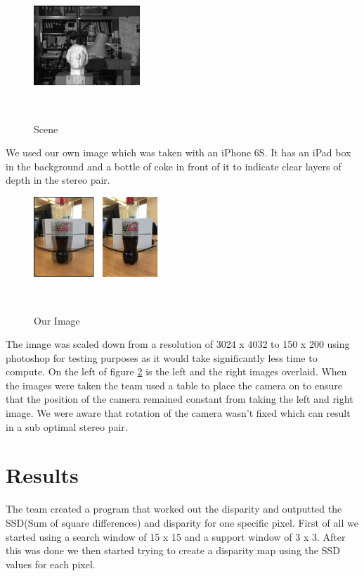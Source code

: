 \documentclass[twocolumn]{article}
\begin{document}
\begin{figure}[H]
\centering
  \includegraphics[width=40mm]{Figures/scene}
    \caption{Scene}~\label{fig:scene}
\end{figure} 

We used our own image which was taken with an iPhone 6S. It has an iPad box in the background and a bottle of coke in front of it to indicate clear layers of depth in the stereo pair.

\begin{figure}[H]
\centering
  \includegraphics[height=30mm]{Figures/Coke_Image}
    \caption{Our Image}~\label{fig:CokeScene}
\end{figure} 

The image was scaled down from a resolution of 3024 x 4032 to 150 x 200 using photoshop for testing purposes as it would take significantly less time to compute. On the left of figure \ref{fig:CokeScene} is the left and the right images overlaid. When the images were taken the team used a table to place the camera on to ensure that the position of the camera remained constant from taking the left and right image. We were aware that rotation of the camera wasn't fixed which can result in a sub optimal stereo pair.  



\section{Results}
\vspace{-1ex}

The team created a program that worked out the disparity and outputted the SSD(Sum of square differences) and disparity for one specific pixel. First of all we started using a search window of 15 x 15 and a support window of 3 x 3. After this was done we then started trying to create a disparity map using the SSD values for each pixel.  
\end{document}
